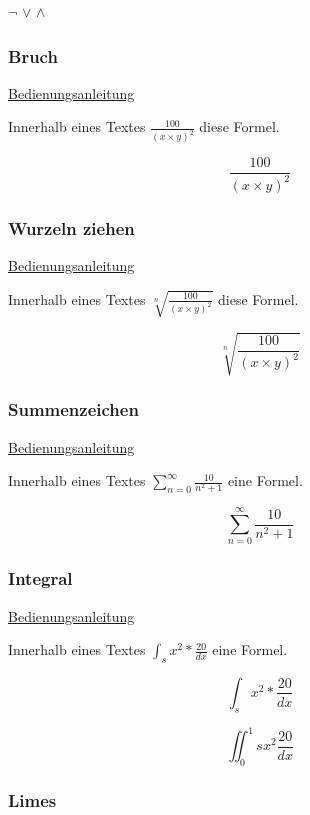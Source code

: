\documentclass[a4paper, 11pt]{article}
\begin{document}
$\neg$ 
$\lor$
$\land$

\newpage

\subsubsection{Bruch}

\href{http://namsu.de/Extra/befehle/Bruch.pdf}{Bedienungsanleitung}

Innerhalb eines Textes $\frac{100}{(x \times y)^2}$ diese Formel.

\[{\frac{100}{(x \times y)^2}}\]

\subsubsection{Wurzeln ziehen}

\href{https://www.namsu.de/Mathematik/1-6-2.html}{Bedienungsanleitung}

Innerhalb eines Textes $\sqrt[n]{\frac{100}{(x \times y)^2}}$ diese Formel.

\[\sqrt[n]{\frac{100}{(x \times y)^2}}\]

\subsubsection{Summenzeichen}

\href{https://de.overleaf.com/learn/latex/Integrals%2C_sums_and_limits}{Bedienungsanleitung}

Innerhalb eines Textes $\sum_{n=0}^{\infty}\frac{10}{n^2+1}$ eine Formel.

\[\sum_{n=0}^{\infty}\frac{10}{n^2+1}\]

\subsubsection{Integral}

\href{https://de.overleaf.com/learn/latex/Integrals%2C_sums_and_limits}{Bedienungsanleitung}

Innerhalb eines Textes $\int_sx^2*\frac{20}{dx}$ eine Formel.

\[\int_sx^2*\frac{20}{dx}\]

\[\iint_{0}^1sx^2\frac{20}{dx}\]

\newpage

\subsubsection{Limes}
\end{document}
